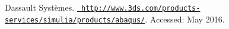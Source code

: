 
\begin{DoxyDescription}
\item[\label{citelist_CITEREF_Abaqus}%
\Hypertarget{citelist_CITEREF_Abaqus}%
\mbox{[}1\mbox{]}]Dassault Systèmes. \href{http://www.3ds.com/products-services/simulia/products/abaqus/}{\texttt{ http\+://www.\+3ds.\+com/products-\/services/simulia/products/abaqus/}}. Accessed\+: May 2016.


\end{DoxyDescription}